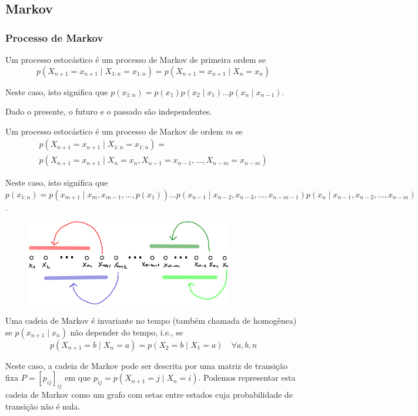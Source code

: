 \subsection{Markov}
\begin{frame}[allowframebreaks]
  \frametitle{Processo de Markov}

  \begin{definition}
  Um processo estocástico é um processo de Markov de primeira ordem se
	\begin{equation}
	p(X_{n+1} = x_{n+1} \mid X_{1:n} = x_{1:n}) = p(X_{n+1} = x_{n+1} \mid X_n = x_n)
	\end{equation}
  \end{definition}
  Neste caso, isto significa que $p(x_{1:n}) = p(x_1)p(x_2 \mid x_1) \ldots p(x_n \mid x_{n-1})$.

  Dado o presente, o futuro e o passado são independentes.


  \begin{definition}
  Um processo estocástico é um processo de Markov de ordem $m$ se
        \begin{eqnarray}
        p(X_{n+1} = x_{n+1} \mid X_{1:n} = x_{1:n}) = \nonumber \\
	p(X_{n+1} = x_{n+1} \mid X_n = x_n, X_{n-1} = x_{n-1}, \ldots , X_{n-m} = x_{n-m})
        \end{eqnarray}
  \end{definition}
  Neste caso, isto significa que $p(x_{1:n}) = p(x_{m+1} \mid x_{m}, x_{m-1}, \ldots, p(x_1)) \ldots p(x_{n-1} \mid x_{n-2}, x_{n-3}, \ldots, x_{n-m-1})  p(x_n \mid x_{n-1}, x_{n-2}, \ldots, x_{n-m})$.

        \begin{figure}[h!]
        \centering
        \includegraphics[width=0.8\textwidth]{images/markov-morder.pdf}
        \label{fig:markov-morder}
        \end{figure}

   \framebreak

   \begin{definition}[Homogêneo]
   Uma cadeia de Markov é invariante no tempo (também chamada de homogênea) se $p(x_{n+1} \mid x_n)$ não
   depender do tempo, i.e., se
	\begin{equation}
	p(X_{n+1} = b \mid X_{n} = a) = p(X_2 = b \mid X_1 = a) \quad \forall a,b,n
	\end{equation}   
   \end{definition}
   Neste caso, a cadeia de Markov pode ser descrita por uma matriz de transição fixa $P = [p_{ij}]_{ij}$
   em que $p_{ij} = p(X_{n+1} = j \mid X_{n} = i)$. Podemos representar esta cadeia de Markov como um grafo 
   com setas entre estados cuja probabilidade de transição não é nula.


\end{frame}
